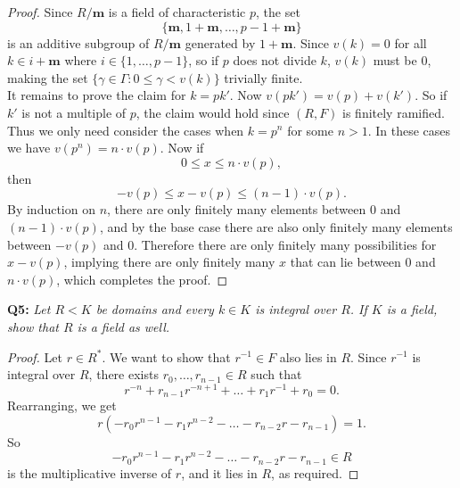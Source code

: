 \documentclass{article}
\begin{document}
  \begin{proof}
    Since $R/\bm{m}$ is a field of characteristic $p$, the set
    \[\{\bm{m},1+\bm{m},\ldots,p-1+\bm{m}\}\]
    is an additive subgroup of $R/\bm{m}$ generated by $1+\bm{m}$.
    Since $v(k)=0$ for all $k\in i+\bm{m}$ where $i\in\{1,\ldots,p-1\}$,
    so if $p$ does not divide $k$, $v(k)$ must be 0, making the set
    $\{\gamma\in\Gamma: 0\leq\gamma<v(k)\}$ trivially finite. \\

    It remains to prove the claim for $k=pk'$. Now $v(pk')=v(p)+v(k')$. So
    if $k'$ is not a multiple of $p$, the claim would hold since $(R,F)$ is
    finitely ramified. Thus we only need consider the cases when $k=p^n$
    for some $n>1$. In these cases we have $v(p^n)=n\cdot v(p)$. Now if
    \[0\leq x\leq n\cdot v(p),\]
    then
    \[-v(p)\leq x-v(p)\leq (n-1)\cdot v(p).\]
    By induction on $n$, there are only finitely many elements between $0$
    and $(n-1)\cdot v(p)$, and by the base case there are also only
    finitely many elements between $-v(p)$ and $0$. Therefore there are
    only finitely many possibilities for $x-v(p)$, implying there are only
    finitely many $x$ that can lie between 0 and $n\cdot v(p)$, which
    completes the proof.
  \end{proof}

\textbf{Q5:} \it Let $R<K$ be domains and every $k\in K$ is integral over
  $R$. If $K$ is a field, show that $R$ is a field as well.
  \begin{proof}
    Let $r\in R^*$. We want to show that $r^{-1}\in F$ also lies in $R$.
    Since $r^{-1}$ is integral over $R$, there exists
    $r_0,\ldots,r_{n-1}\in R$ such that
    \[r^{-n}+r_{n-1}r^{-n+1} +\ldots +r_1r^{-1}+r_0=0.\]
    Rearranging, we get
    \[r(-r_0r^{n-1} -r_1r^{n-2} -\ldots -r_{n-2}r -r_{n-1}) = 1.\]
    So
    \[-r_0r^{n-1} -r_1r^{n-2} -\ldots -r_{n-2}r -r_{n-1} \in R\]
    is the multiplicative inverse of $r$, and it lies in $R$, as required.
  \end{proof}
\end{document}
